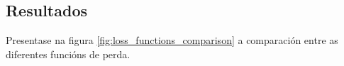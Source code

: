 \subsection{Resultados}
\label{subsec:Resultados-perda}

Presentase na figura \ref{fig:loss_functions_comparison} a comparación entre as diferentes funcións de perda.





